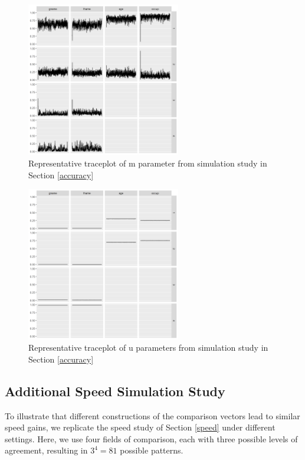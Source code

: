 \documentclass[ba]{imsart}
\begin{document}
	
	\begin{figure}[!h]
		\begin{center}
			\includegraphics[width=0.6\textwidth]{../notes/figures/sim_m_trace} 
			\caption{Representative traceplot of m parameter from simulation study in Section \ref{accuracy}}\label{fig:sim_m_trace}
		\end{center}
	\end{figure}
	
	\begin{figure}[!h]
		\begin{center}
			\includegraphics[width=0.6\textwidth]{../notes/figures/sim_u_trace} 
			\caption{Representative traceplot of u parameters from simulation study in Section \ref{accuracy}}\label{fig:sim_u_trace}
		\end{center}
	\end{figure}

\clearpage

	\hypertarget{appendix-speed}{%
	\subsection{Additional Speed Simulation Study}\label{app:appendix-speed}}
	To illustrate that different constructions of the comparison vectors lead to similar speed gains, we replicate the speed study of Section \ref{speed} under different settings. Here, we use four fields of comparison, each with three possible levels of agreement, resulting in $3^4 = 81$ possible patterns.
	
\end{document}
